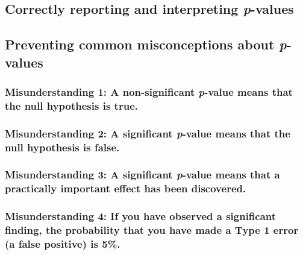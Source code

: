 \documentclass[
  oneside]{krantz}
\begin{document}
\hypertarget{correctly-reporting-and-interpreting-p-values}{%
\subsection{\texorpdfstring{Correctly reporting and interpreting
\emph{p}-values}{Correctly reporting and interpreting p-values}}\label{correctly-reporting-and-interpreting-p-values}}

\hypertarget{misconceptions}{%
\subsection{\texorpdfstring{Preventing common misconceptions about
\emph{p}-values}{Preventing common misconceptions about p-values}}\label{misconceptions}}

\hypertarget{misconception1}{%
\subsubsection{\texorpdfstring{Misunderstanding 1: A non-significant
\emph{p}-value means that the null hypothesis is
true.}{Misunderstanding 1: A non-significant p-value means that the null hypothesis is true.}}\label{misconception1}}

\hypertarget{misunderstanding-2-a-significant-p-value-means-that-the-null-hypothesis-is-false.}{%
\subsubsection{\texorpdfstring{Misunderstanding 2: A significant
\emph{p}-value means that the null hypothesis is
false.}{Misunderstanding 2: A significant p-value means that the null hypothesis is false.}}\label{misunderstanding-2-a-significant-p-value-means-that-the-null-hypothesis-is-false.}}

\hypertarget{misunderstanding-3-a-significant-p-value-means-that-a-practically-important-effect-has-been-discovered.}{%
\subsubsection{\texorpdfstring{Misunderstanding 3: A significant
\emph{p}-value means that a practically important effect has been
discovered.}{Misunderstanding 3: A significant p-value means that a practically important effect has been discovered.}}\label{misunderstanding-3-a-significant-p-value-means-that-a-practically-important-effect-has-been-discovered.}}

\hypertarget{misconception4}{%
\subsubsection{Misunderstanding 4: If you have observed a significant
finding, the probability that you have made a Type 1 error (a false
positive) is 5\%.}\label{misconception4}}
\end{document}
